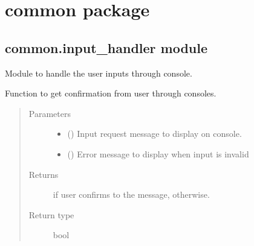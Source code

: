 \documentclass[letterpaper,10pt,english]{sphinxmanual}
\begin{document}
\chapter{common package}
\label{\detokenize{docs/source/common:common-package}}\label{\detokenize{docs/source/common::doc}}

\section{common.input\_handler module}
\label{\detokenize{docs/source/common:module-common.input_handler}}\label{\detokenize{docs/source/common:common-input-handler-module}}
Module to handle the user inputs through console.

\begin{fulllineitems}
\label{\detokenize{docs/source/common:common.input_handler.get_confirmation}}
Function to get confirmation from user through consoles.
\begin{quote}\begin{description}
\item[{Parameters}] \leavevmode\begin{itemize}
\item {} 
 () \textendash{} Input request message to display on console.

\item {} 
 () \textendash{} Error message to display when input is invalid

\end{itemize}

\item[{Returns}] \leavevmode
{} if user confirms to the message,  otherwise.

\item[{Return type}] \leavevmode
bool

\end{description}\end{quote}

\end{fulllineitems}
\end{document}
